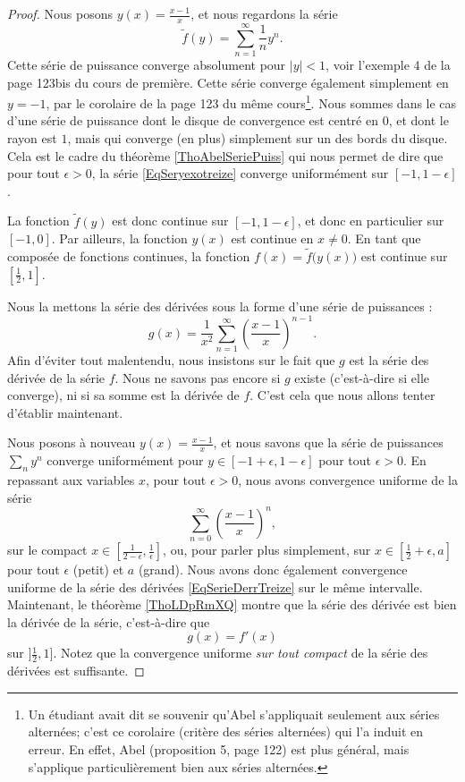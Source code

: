 \begin{proof}
	Nous posons $y(x)=\frac{ x-1 }{ x }$, et nous regardons la série
	\begin{equation}		\label{EqSeryexotreize}
		\tilde f(y)=\sum_{n=1}^{\infty}\frac{1}{ n }y^n.
	\end{equation}
	Cette série de puissance converge absolument pour $| y |<1$, voir l'exemple 4 de la page 123bis du cours de première. Cette série converge également simplement en $y=-1$, par le corolaire de la page 123 du même cours\footnote{Un étudiant avait dit se souvenir qu'Abel s'appliquait seulement aux séries alternées; c'est ce corolaire (critère des séries alternées) qui l'a induit en erreur. En effet, Abel (proposition 5, page 122) est plus général, mais s'applique particulièrement bien aux séries alternées.}. Nous sommes dans le cas d'une série de puissance dont le disque de convergence est centré en $0$, et dont le rayon est $1$, mais qui converge (en plus) simplement sur un des bords du disque. Cela est le cadre du théorème \ref{ThoAbelSeriePuiss} qui nous permet de dire que pour tout $\epsilon>0$, la série \eqref{EqSeryexotreize} converge uniformément sur $[-1,1-\epsilon]$.

	La fonction $\tilde f(y)$ est donc continue sur $[-1,1-\epsilon]$, et donc en particulier sur $[-1,0]$. Par ailleurs, la fonction $y(x)$ est continue en $x\neq 0$. En tant que composée de fonctions continues, la fonction $f(x)=\tilde f\big( y(x) \big)$ est continue sur $[\frac{ 1 }{2},1]$.

	Nous la mettons la série des dérivées sous la forme d'une série de puissances :
	\begin{equation}		\label{EqSerieDerrTreize}
		g(x)=\frac{1}{ x^2 }\sum_{n=1}^{\infty} \left( \frac{ x-1 }{ x } \right)^{n-1}.
	\end{equation}
	Afin d'éviter tout malentendu, nous insistons sur le fait que $g$ est la série des dérivée de la série $f$. Nous ne savons pas encore si $g$ existe (c'est-à-dire si elle converge), ni si sa somme est la dérivée de $f$. C'est cela que nous allons tenter d'établir maintenant.

	Nous posons à nouveau $y(x)=\frac{ x-1 }{ x }$, et nous savons que la série de puissances $\sum_ny^n$ converge uniformément pour $y\in[-1+\epsilon,1-\epsilon]$ pour tout $\epsilon>0$. En repassant aux variables $x$, pour tout $\epsilon>0$, nous avons convergence uniforme de la série
	\begin{equation}
		\sum_{n=0}^{\infty} \left( \frac{ x-1 }{ x } \right)^n,
	\end{equation}
	sur le compact $x\in[\frac{ 1 }{ 2-\epsilon },\frac{1}{ \epsilon }]$, ou, pour parler plus simplement, sur $x\in[\frac{ 1 }{2}+\epsilon,a]$ pour tout $\epsilon$ (petit) et $a$ (grand). Nous avons donc également convergence uniforme de la série des dérivées \eqref{EqSerieDerrTreize} sur le même intervalle. Maintenant, le théorème \ref{ThoLDpRmXQ} montre que la série des dérivée est bien la dérivée de la série, c'est-à-dire que
	\begin{equation}
		g(x)=f'(x)
	\end{equation}
	sur $]\frac{ 1 }{ 2 },1]$. Notez que la convergence uniforme \emph{sur tout compact} de la série des dérivées est suffisante.


\end{proof}
